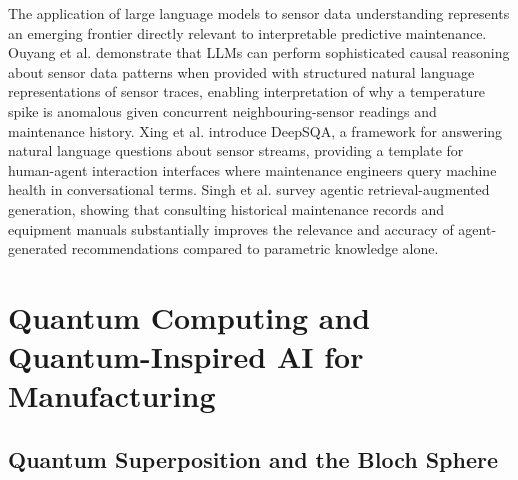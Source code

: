 The application of large language models to sensor data understanding represents an emerging frontier directly relevant to interpretable predictive maintenance. Ouyang et al. \cite{ouyang_llmsense_2024} demonstrate that LLMs can perform sophisticated causal reasoning about sensor data patterns when provided with structured natural language representations of sensor traces, enabling interpretation of why a temperature spike is anomalous given concurrent neighbouring-sensor readings and maintenance history. Xing et al. \cite{xing_deepsqa_2021} introduce DeepSQA, a framework for answering natural language questions about sensor streams, providing a template for human-agent interaction interfaces where maintenance engineers query machine health in conversational terms. Singh et al. \cite{singh_agentic_2025} survey agentic retrieval-augmented generation, showing that consulting historical maintenance records and equipment manuals substantially improves the relevance and accuracy of agent-generated recommendations compared to parametric knowledge alone.

\section{Quantum Computing and Quantum-Inspired AI for Manufacturing}

\subsection{Quantum Superposition and the Bloch Sphere}

